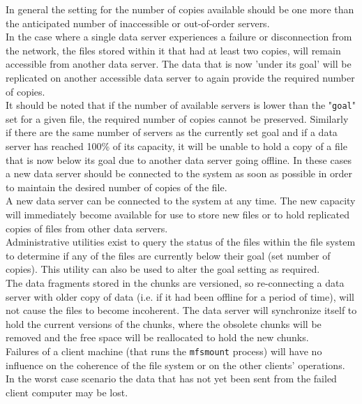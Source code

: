 \documentclass[a4paper,11pt,english]{report}
\def\code#1{\texttt{#1}}
\begin{document}
		In general the setting for the number of copies available should be one more than the anticipated number of inaccessible or out-of-order servers.\\
		
		In the case where a single data server experiences a failure or disconnection from the network, the files stored within it that had at least two copies, will remain accessible from another data server. The data that is now 'under its goal' will be replicated on another accessible data server to again provide the required number of copies.\\
		
		It should be noted that if the number of available servers is lower than the "\code{goal}" set for a given file, the required number of copies cannot be preserved. Similarly if there are the same number of servers as the currently set goal and if a data server has reached 100\% of its capacity, it will be unable to hold a copy of a file that is now below its goal due to another data server going offline.  In these cases a new data server should be connected to the system as soon as possible in order to maintain the desired number of copies of the file.\\
		
		A new data server can be connected to the system at any time.  The new capacity will immediately become available for use to store new files or to hold replicated copies of files from other data servers.\\
		
		Administrative utilities exist to query the status of the files within the file system to determine if any of the files are currently below their goal (set number of copies). This utility can also be used to alter the goal setting as required.\\
		
		The data fragments stored in the chunks are versioned, so re-connecting a data server with older copy of data (i.e. if it had been offline for a period of time), will not cause the files to become incoherent. The data server will synchronize itself to hold the current versions of the chunks, where the obsolete chunks will be removed and the free space will be reallocated to hold the new chunks.\\
		
		Failures of a client machine (that runs the \code{mfsmount} process) will have no influence on the coherence of the file system or on the other clients' operations. In the worst case scenario the data that has not yet been sent from the failed client computer may be lost.
		
\end{document}
